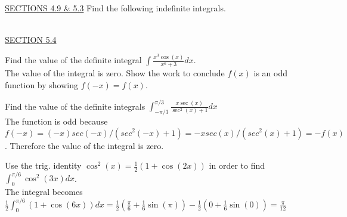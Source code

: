 \documentclass{exam}
\begin{document}
\begin{questions}
\ \\
\underline{SECTIONS 4.9 \& 5.3}
\question Find the following indefinite integrals.
  \begin{parts}
  \end{parts}



\ \\
\underline{SECTION 5.4}

\question Find the value of the definite integral $\displaystyle\int \frac{x^3\cos(x)}{x^6+3}dx$. 
\\ {\color{red} The value of the integral is zero.  Show the work to conclude $f(x)$ is an odd function by showing $f(-x)=f(x)$.}

\question Find the value of the definite integrals $\displaystyle\int_{-\pi/3}^{\pi/3} \frac{x\sec(x)}{\sec^2(x) + 1} dx$ \\ {\color{red} The function is odd because $f(-x) = (-x)sec(-x)/(sec^2(-x)+1) = -xsec(x)/(sec^2(x)+1) = -f(x)$.  Therefore the value of the integral is zero.}

\question Use the trig. identity $\cos^2(x) = \frac{1}{2}\left( 1 + \cos(2x) \right)$ in order to find $\displaystyle\int_0^{\pi/6} \cos^2(3x) dx$.
\\  {\color{red} The integral becomes $\frac{1}{2}\displaystyle\int_0^{\pi/6} \left( 1 + \cos(6x) \right) dx  = \frac{1}{2} \left( \frac{\pi}{6} + \frac{1}{6}\sin(\pi)\right) - \frac{1}{2} \left( 0 + \frac{1}{6}\sin(0)\right) = \frac{\pi}{12} $}


\end{questions}
\end{document}
